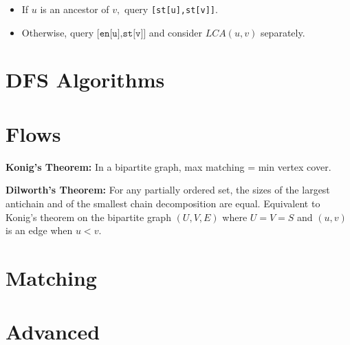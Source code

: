 		\begin{itemize}
		\item If $u$ is an ancestor of $v,$ query \texttt{[st[u],st[v]]}.
		\item Otherwise, query $\texttt{[en[u],st[v]]}$ and consider $LCA(u,v)$ separately.
		\end{itemize}

\section{DFS Algorithms}

\section{Flows}

	\textbf{Konig's Theorem:} In a bipartite graph, max matching = min vertex cover.

	\textbf{Dilworth's Theorem:} For any partially ordered set, the sizes of the largest antichain and of the smallest chain decomposition are equal. Equivalent to Konig's theorem on the bipartite graph $(U,V,E)$ where $U=V=S$ and $(u,v)$ is an edge when $u<v.$ %


\section{Matching}


\section{Advanced}

